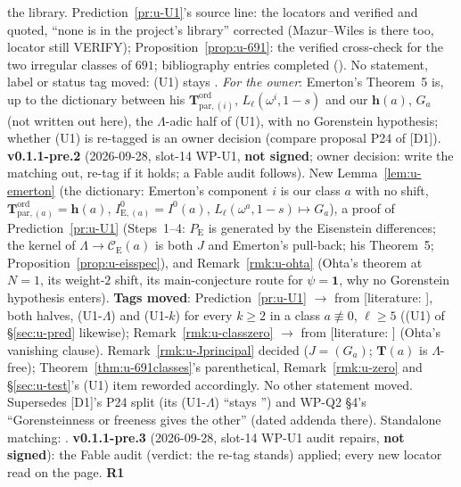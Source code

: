 \documentclass[11pt]{article}
\newcommand{\LIT}[1]{\textsf{[literature: #1]}}   %
\newcommand{\VERIFYloc}{\textsf{VERIFY}}          %
\newcommand{\Iw}{\Lambda}                         %
\newcommand{\hcusp}{\mathbf{h}}                   %
\newcommand{\Tu}{\mathbf{T}}                      %
\newcommand{\Eis}{\mathrm{E}}
\newcommand{\Cg}{\mathcal{C}}                     %
\begin{document}
the library. Prediction~\ref{pr:u-U1}'s source line: the locators \cite[Thm.~5]{emerton_eis} and \cite[Thm.~(1.5.5)]{ohta_cong} verified and quoted,
``none is in the project's library'' corrected (Mazur--Wiles is there too, locator still \VERIFYloc); Proposition~\ref{prop:u-691}: the verified
cross-check \cite{citro_ghitza} for the two irregular classes of $691$; bibliography entries completed (). No statement,
label or status tag moved: (U1) stays \CONJ. \emph{For the owner}: Emerton's Theorem~5 is, up to the dictionary between his $\mathbf T^{\mathrm{ord}}_{\mathrm{par},(i)}$,
$L_\ell(\omega^{i},1-s)$ and our $\hcusp(a)$, $G_a$ (not written out here), the $\Iw$-adic half of (U1), with no Gorenstein hypothesis; whether (U1) is
re-tagged is an owner decision (compare proposal P24 of [D1]).
\textbf{v0.1.1-pre.2} (2026-09-28, slot-14 WP-U1, \textbf{not signed}; owner decision: write the matching out, re-tag if it holds; a Fable audit follows).
New Lemma~\ref{lem:u-emerton} (the dictionary: Emerton's component $i$ is our class $a$ with no shift, $\mathbf T^{\mathrm{ord}}_{\mathrm{par},(a)}=\hcusp(a)$,
$I^{0}_{\Eis,(a)}=I^{0}(a)$, $L_\ell(\omega^{a},1-s)\mapsto G_a$), a proof of Prediction~\ref{pr:u-U1} (Steps~1--4: $P_\Eis$ is generated by the Eisenstein
differences; the kernel of $\Iw\to\Cg_\Eis(a)$ is both $J$ and Emerton's pull-back; his Theorem~5; Proposition~\ref{prop:u-eisspec}), and
Remark~\ref{rmk:u-ohta} (Ohta's theorem at $N=1$, its weight-$2$ shift, its main-conjecture route for $\psi=\mathbf1$, why no Gorenstein hypothesis
enters). \textbf{Tags moved}: Prediction~\ref{pr:u-U1} \CONJ{} $\to$ \PROVED{} from \LIT{}, both halves, (U1-$\Iw$) and (U1-$k$) for every $k\ge2$ in a class
$a\not\equiv0$, $\ell\ge5$ ((U1) of \S\ref{sec:u-pred} likewise); Remark~\ref{rmk:u-classzero} \CONJ{} $\to$ \PROVED{} from \LIT{} (Ohta's vanishing clause).
Remark~\ref{rmk:u-Jprincipal} decided ($J=(G_a)$; $\Tu(a)$ is $\Iw$-free); Theorem~\ref{thm:u-691classes}'s parenthetical, Remark~\ref{rmk:u-zero} and
\S\ref{sec:u-test}'s (U1) item reworded accordingly. No other statement moved. Supersedes [D1]'s P24 split (its (U1-$\Iw$) ``stays \CONJ'') and WP-Q2 \S4's
``Gorensteinness or freeness gives the other'' (dated addenda there). Standalone matching: .
\textbf{v0.1.1-pre.3} (2026-09-28, slot-14 WP-U1 audit repairs, \textbf{not signed}): the Fable audit
 (verdict: the re-tag stands) applied; every new locator read on the page. \textbf{R1}
\end{document}
